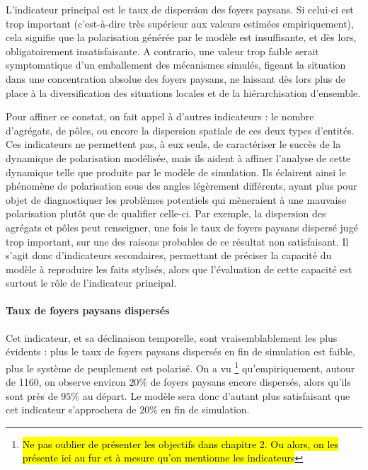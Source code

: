 L'indicateur principal est le taux de dispersion des foyers paysans. Si celui-ci est trop important (c'est-à-dire très supérieur aux valeurs estimées empiriquement), cela signifie que la polarisation générée par le modèle est insuffisante, et dès lors, obligatoirement insatisfaisante. A contrario, une valeur trop faible serait symptomatique d'un emballement des mécanismes simulés, figeant la situation dans une concentration absolue des foyers paysans, ne laissant dès lors plus de place à la diversification des situations locales et de la hiérarchisation d'ensemble.

Pour affiner ce constat, on fait appel à d'autres indicateurs : le nombre d'agrégats, de pôles, ou encore la dispersion spatiale de ces deux types d'entités.
Ces indicateurs ne permettent pas, à eux seuls, de caractériser le succès de la dynamique de polarisation modélisée, mais ils aident à affiner l'analyse de cette dynamique telle que produite par le modèle de simulation.
Ils éclairent ainsi le phénomène de polarisation sous des angles légèrement différents, ayant plus pour objet de diagnostiquer les problèmes potentiels qui mèneraient à une mauvaise polarisation plutôt que de qualifier celle-ci.
Par exemple, la dispersion des agrégats et pôles peut renseigner, une fois le taux de foyers paysans dispersé jugé trop important, sur une des raisons probables de ce résultat non satisfaisant.
Il s'agit donc d'indicateurs secondaires, permettant de préciser la capacité du modèle à reproduire les faits stylisés, alors que l'évaluation de cette capacité est surtout le rôle de l'indicateur principal.

\paragraph{Taux de foyers paysans dispersés}

Cet indicateur, et sa déclinaison temporelle, sont vraisemblablement les plus évidents : plus le taux de foyers paysans dispersés en fin de simulation est faible, plus le système de peuplement est polarisé. On a vu \footnote{\hl{Ne pas oublier de présenter les objectifs dans chapitre 2. Ou alors, on les présente ici au fur et à mesure qu'on mentionne les indicateurs}} qu'empiriquement, autour de 1160, on observe environ $20\%$ de foyers paysans encore dispersés, alors qu'ils sont près de $95\%$ au départ.
Le modèle sera donc d'autant plus satisfaisant que cet indicateur s'approchera de $20\%$ en fin de simulation.

